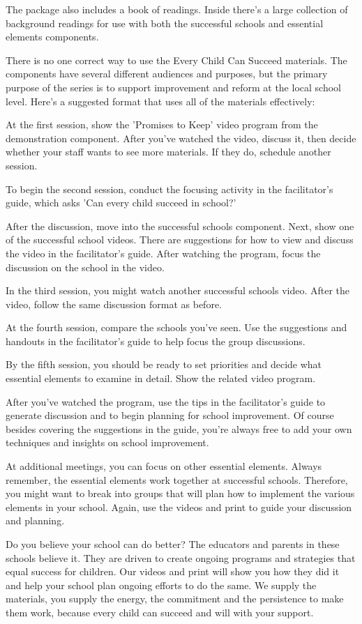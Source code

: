 The package also includes a book of readings.
Inside there's a large collection of background readings for use with both the successful schools and essential elements components.

There is no one correct way to use the Every Child Can Succeed materials.
The components have several different audiences and purposes, but the primary purpose of the series is to support improvement and reform at the local school level.
Here's a suggested format that uses all of the materials effectively:

At the first session, show the 'Promises to Keep' video program from the demonstration component.
After you've watched the video, discuss it, then decide whether your staff wants to see more materials.
If they do, schedule another session.

To begin the second session, conduct the focusing activity in the facilitator's guide, which asks 'Can every child succeed in school?'

After the discussion, move into the successful schools component.
Next, show one of the successful school videos.
There are suggestions for how to view and discuss the video in the facilitator's guide.
After watching the program, focus the discussion on the school in the video.

In the third session, you might watch another successful schools video.
After the video, follow the same discussion format as before.

At the fourth session, compare the schools you've seen.
Use the suggestions and handouts in the facilitator's guide to help focus the group discussions.

By the fifth session, you should be ready to set priorities and decide what essential elements to examine in detail.
Show the related video program.

After you've watched the program, use the tips in the facilitator's guide to generate discussion and to begin planning for school improvement.
Of course besides covering the suggestions in the guide, you're always free to add your own techniques and insights on school improvement.

At additional meetings, you can focus on other essential elements.
Always remember, the essential elements work together at successful schools.
Therefore, you might want to break into groups that will plan how to implement the various elements in your school.
Again, use the videos and print to guide your discussion and planning.

Do you believe your school can do better?
The educators and parents in these schools believe it.
They are driven to create ongoing programs and strategies that equal success for children.
Our videos and print will show you how they did it and help your school plan ongoing efforts to do the same.
We supply the materials, you supply the energy, the commitment and the persistence to make them work, because every child can succeed and will with your support.